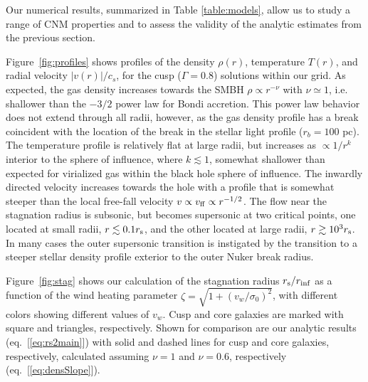 \documentclass[usenatbib,fleqn]{mn2e}
\newcommand{\rb}{r_b}
\newcommand{\densSlope}{\nu}
\begin{document}
Our numerical results, summarized in Table \ref{table:models}, allow
us to study a range of CNM properties and to assess the validity of
the analytic estimates from the previous section.  

Figure~\ref{fig:profiles} shows profiles of the density $\rho(r)$,
temperature $T(r)$, and radial velocity $|v(r)|/c_s$, for the cusp ($\Gamma=0.8$) solutions within our
grid.  As expected, the gas density increases towards the SMBH
$\rho\propto r^{-\densSlope}$ with $\densSlope\simeq1$, i.e. shallower
than the $-3/2$ power law for Bondi accretion. This power law behavior
does not extend through all radii, however, as the gas density profile
has a break coincident with the location of the break in the stellar
light profile ($\rb=100$ pc). The temperature profile is relatively
flat at large radii, but increases as $\propto 1/r^{k}$ interior to
the sphere of influence, where $k\lesssim 1$, somewhat shallower than
expected for virialized gas within the black hole sphere of influence.
The inwardly directed velocity increases towards the hole with a
profile that is somewhat steeper than the local free-fall velocity $v
\propto v_{\rm ff}\propto r^{-1/2}$.  The flow near the stagnation
radius is subsonic, but becomes supersonic at two critical points, one
located at small radii, $r \lesssim 0.1r_{\rm s}$, and the other
located at large radii, $r \gtrsim 10^{3}r_{\rm s}$.  In many cases
the outer supersonic transition is instigated by the transition to a steeper
stellar density profile exterior to the outer Nuker break radius.

Figure~\ref{fig:stag} shows our calculation of the stagnation radius
$r_{\rm s}/r_{\rm inf}$ as a function of the wind heating parameter
$\zeta = \sqrt{1+(v_w/\sigma_0)^{2}}$, with different colors
showing different values of $v_{w}$.  Cusp and core galaxies are
marked with square and triangles, respectively.  Shown for comparison
are our analytic results (eq.~[\ref{eq:rs2main}]) with solid and
dashed lines for cusp and core galaxies, respectively, calculated
assuming $\densSlope = 1$ and $\densSlope= 0.6$, respectively
(eq.~[\ref{eq:densSlope}]).
\end{document}
